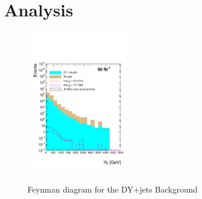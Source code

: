 \chapter{Analysis}

 \begin{figure}[h] 
 \centering
 \caption{Feynman diagram for the DY+jets Background}
 \includegraphics[width=0.4\textwidth]{./Capitulos/Analysis/AfterBJets/HT_MET_20} 
 \label{dy_jets_feynman}
 \end{figure}